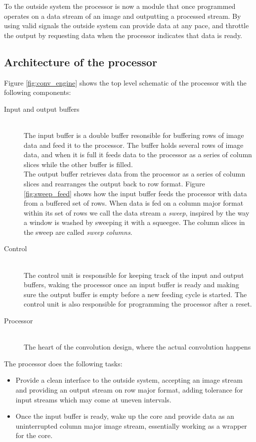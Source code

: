 To the outside system the processor is now a module that once programmed operates on a data stream of an image and outputting a processed stream. 
By using valid signals the outside system can provide data at any pace, and throttle the output by requesting data when the processor indicates that data is ready. 

\subsection{Architecture of the processor}

Figure \ref{fig:conv_engine} shows the top level schematic of the processor with the following components:

\begin{description}
    \item[Input and output buffers] \hfill\\
        The input buffer is a double buffer resonsible for buffering rows of image data and feed it to the processor.
        The buffer holds several rows of image data, and when it is full it feeds data to the processor as a series of column slices while the other buffer is filled.\\
        The output buffer retrieves data from the processor as a series of column slices and rearranges the output back to row format.
        Figure \ref{fig:sweep_feed} shows how the input buffer feeds the processor with data from a buffered set of rows.
        When data is fed on a column major format within its set of rows we call the data stream a \textit{sweep}, inspired by the way a window is washed by sweeping it with a squeegee.
        The column slices in the sweep are called \textit{sweep columns}.
    \item[Control] \hfill\\
        The control unit is responsible for keeping track of the input and output buffers, waking the processor once an input buffer is ready and making sure the output buffer is empty before a new feeding cycle is started.
        The control unit is also responsible for programming the processor after a reset.
    \item[Processor] \hfill\\
        The heart of the convolution design, where the actual convolution happens
\end{description}

The processor does the following tasks:
\begin{itemize}
    \item Provide a clean interface to the outside system, accepting an image stream and providing an output stream on row major format, adding tolerance for input streams which may come at uneven intervals. 
    \item Once the input buffer is ready, wake up the core and provide data as an uninterrupted column major image stream, essentially working as a wrapper for the core.
\end{itemize}

